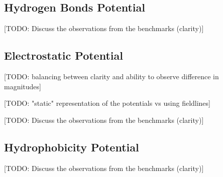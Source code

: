   \subsection{Hydrogen Bonds Potential}
    [TODO: Discuss the observations from the benchmarks (clarity)]

  \subsection{Electrostatic Potential}
    [TODO: balancing between clarity and ability to observe difference in magnitudes]

    [TODO: "static" representation of the potentials vs using fieldlines]

    [TODO: Discuss the observations from the benchmarks (clarity)]

  \subsection{Hydrophobicity Potential}
    [TODO: Discuss the observations from the benchmarks (clarity)]


